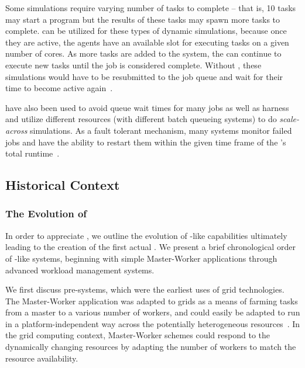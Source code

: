 \documentclass{sig-alternate}
\begin{document}
Some simulations require varying number of tasks to complete -- that
is, 10 tasks may start a program but the results of these tasks may
spawn more tasks to complete. \pilotjobs can be utilized for these
types of dynamic simulations, because once they are active, the agents
have an available slot for executing tasks on a given number of
cores. As more tasks are added to the system, the \pilot can continue
to execute new tasks until the job is considered
complete. Without \pilotjobs, these simulations would have to be
resubmitted to the job queue and wait for their time to become active again~\cite{luckow2009adaptive}. 

\pilotjobs have also been used to avoid queue wait times for many jobs
as well as harness and utilize different resources (with different
batch queueing systems) to do \textit{scale-across} simulations.
As a fault tolerant mechanism, many \pilotjob systems monitor
failed jobs and have the ability to restart them within the given 
time frame of the \pilotjob's total runtime~\cite{1742-6596-219-6-062049,condor-g,nilsson2011atlas}. 

\subsection{Historical Context}
\subsubsection*{The Evolution of \pilotjobs}

In order to appreciate \pilotjobs, we outline the evolution of
\pilot-like capabilities ultimately leading to the creation of the
first actual \pilotjob. We present a brief chronological order of
\pilotjob-like systems, beginning with simple Master-Worker
applications through advanced workload management systems.

We first discuss pre-\pilotjob systems, which were the earliest uses
of grid technologies. The Master-Worker application was adapted to
grids as a means of farming tasks from a master to a various number of
workers, and could easily be adapted to run in a platform-independent
way across the potentially heterogeneous resources~\cite{masterworker,
  Goux00anenabling}. In the grid computing context, Master-Worker
schemes could respond to the dynamically changing resources by
adapting the number of workers to match the resource
availability. 

\end{document}
